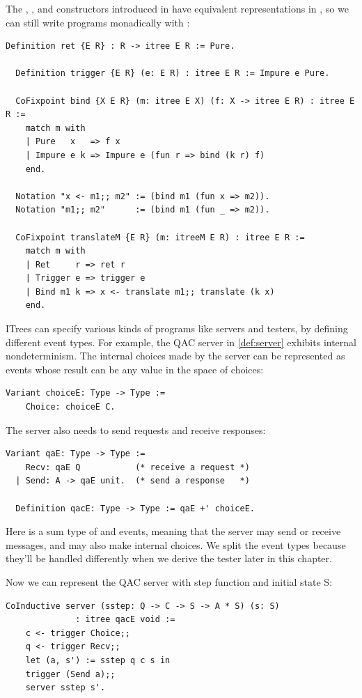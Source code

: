 The , , and  constructors introduced in
 have equivalent representations in , so we can still
write programs monadically with \ilc{(;;)} :
\begin{lstlisting}[style=customcoq]
  Definition ret {E R} : R -> itree E R := Pure.
  
  Definition trigger {E R} (e: E R) : itree E R := Impure e Pure.

  CoFixpoint bind {X E R} (m: itree E X) (f: X -> itree E R) : itree E R :=
    match m with
    | Pure   x   => f x
    | Impure e k => Impure e (fun r => bind (k r) f)
    end.

  Notation "x <- m1;; m2" := (bind m1 (fun x => m2)).
  Notation "m1;; m2"      := (bind m1 (fun _ => m2)).

  CoFixpoint translateM {E R} (m: itreeM E R) : itree E R :=
    match m with
    | Ret     r => ret r
    | Trigger e => trigger e
    | Bind m1 k => x <- translate m1;; translate (k x)
    end.
\end{lstlisting}

ITrees can specify various kinds of programs like servers and testers, by
defining different event types.  For example, the QAC server in
\autoref{def:server} exhibits internal nondeterminism.  The internal choices
made by the server can be represented as  events whose result can be
any value in the space of choices:
\begin{lstlisting}[style=customcoq]
  Variant choiceE: Type -> Type :=
    Choice: choiceE C.
\end{lstlisting}

The server also needs to send requests and receive responses:
\begin{lstlisting}[style=customcoq]
  Variant qaE: Type -> Type :=
    Recv: qaE Q           (* receive a request *)
  | Send: A -> qaE unit.  (* send a response   *)

  Definition qacE: Type -> Type := qaE +' choiceE.
\end{lstlisting}

Here  is a sum type of  and  events, meaning
that the server may send or receive messages, and may also make internal
choices.  We split the event types because they'll be handled differently when
we derive the tester later in this chapter.

Now we can represent the QAC server with step function  and initial
state \ilc S:
\begin{lstlisting}[style=customcoq]
  CoInductive server (sstep: Q -> C -> S -> A * S) (s: S)
              : itree qacE void :=
    c <- trigger Choice;;
    q <- trigger Recv;;
    let (a, s') := sstep q c s in
    trigger (Send a);;
    server sstep s'.
\end{lstlisting}


